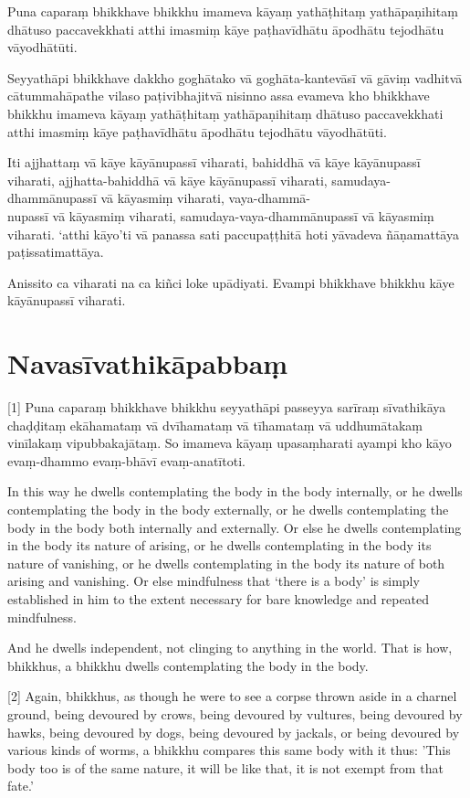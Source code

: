 Puna caparaṃ bhikkhave bhikkhu imameva kāyaṃ yathāṭhitaṃ yathāpaṇihitaṃ dhātuso
paccavekkhati atthi imasmiṃ kāye paṭhavīdhātu āpodhātu tejodhātu vāyodhātūti.

Seyyathāpi bhikkhave dakkho goghātako vā goghāta-kantevāsī vā gāviṃ vadhitvā
cātummahāpathe vilaso paṭivibhajitvā nisinno assa evameva kho bhikkhave bhikkhu
imameva kāyaṃ yathāṭhitaṃ yathāpaṇihitaṃ dhātuso paccavekkhati atthi imasmiṃ
kāye paṭhavīdhātu āpodhātu tejodhātu vāyodhātūti.

Iti ajjhattaṃ vā kāye kāyānupassī viharati, bahiddhā vā kāye kāyānupassī
viharati, ajjhatta-bahiddhā vā kāye kāyānupassī viharati, samudaya-dhammānupassī
vā kāyasmiṃ viharati, vaya-dhammā-\\
nupassī vā kāyasmiṃ viharati, samudaya-vaya-dhammānupassī vā kāyasmiṃ viharati.
`atthi kāyo'ti vā panassa sati paccupaṭṭhitā hoti yāvadeva ñāṇamattāya
paṭissatimattāya.

Anissito ca viharati na ca kiñci loke upādiyati. Evampi bhikkhave bhikkhu kāye
kāyānupassī viharati.


\section*{Navasīvathikāpabbaṃ}

[1] Puna caparaṃ bhikkhave bhikkhu seyyathāpi passeyya sarīraṃ sīvathikāya chaḍḍitaṃ
ekāhamataṃ vā dvīhamataṃ vā tīhamataṃ vā uddhumātakaṃ vinīlakaṃ vipubbakajātaṃ.
So imameva kāyaṃ upasaṃharati ayampi kho kāyo evaṃ-dhammo evaṃ-bhāvī
evaṃ-anatītoti.

\englishPage

In this way he dwells contemplating the body in the body internally, or he
dwells contemplating the body in the body externally, or he dwells contemplating
the body in the body both internally and externally. Or else he dwells
contemplating in the body its nature of arising, or he dwells contemplating in
the body its nature of vanishing, or he dwells contemplating in the body its
nature of both arising and vanishing. Or else mindfulness that ‘there is a body’
is simply established in him to the extent necessary for bare knowledge and
repeated mindfulness.

And he dwells independent, not clinging to anything in the world. That is how,
bhikkhus, a bhikkhu dwells contemplating the body in the body.

[2] Again, bhikkhus, as though he were to see a corpse thrown aside in a charnel
ground, being devoured by crows, being devoured by vultures, being devoured by
hawks, being devoured by dogs, being devoured by jackals, or being devoured by
various kinds of worms, a bhikkhu compares this same body with it thus: 'This
body too is of the same nature, it will be like that, it is not exempt from that
fate.'

